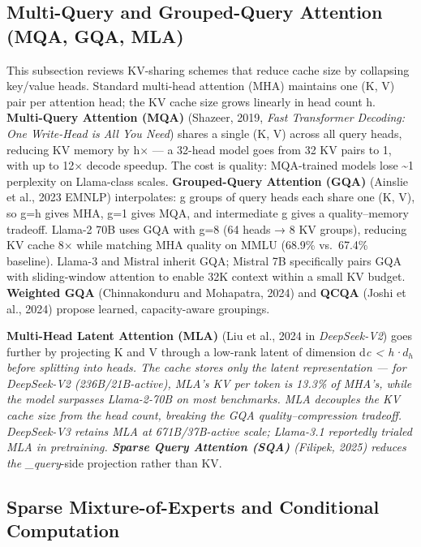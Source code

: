 \subsection{Multi-Query and Grouped-Query Attention (MQA, GQA, MLA)}\label{multi-query-and-grouped-query-attention-mqa-gqa-mla}

This subsection reviews KV-sharing schemes that reduce cache size by collapsing key/value heads. Standard multi-head attention (MHA) maintains one (K, V) pair per attention head; the KV cache size grows linearly in head count h. \textbf{Multi-Query Attention (MQA)} (Shazeer, 2019, \emph{Fast Transformer Decoding: One Write-Head is All You Need}) shares a single (K, V) across all query heads, reducing KV memory by h× --- a 32-head model goes from 32 KV pairs to 1, with up to 12× decode speedup. The cost is quality: MQA-trained models lose \textasciitilde1 perplexity on Llama-class scales. \textbf{Grouped-Query Attention (GQA)} (Ainslie et al., 2023 EMNLP) interpolates: g groups of query heads each share one (K, V), so g=h gives MHA, g=1 gives MQA, and intermediate g gives a quality--memory tradeoff. Llama-2 70B uses GQA with g=8 (64 heads → 8 KV groups), reducing KV cache 8× while matching MHA quality on MMLU (68.9\% vs.~67.4\% baseline). Llama-3 and Mistral inherit GQA; Mistral 7B specifically pairs GQA with sliding-window attention to enable 32K context within a small KV budget. \textbf{Weighted GQA} (Chinnakonduru and Mohapatra, 2024) and \textbf{QCQA} (Joshi et al., 2024) propose learned, capacity-aware groupings.

\textbf{Multi-Head Latent Attention (MLA)} (Liu et al., 2024 in \emph{DeepSeek-V2}) goes further by projecting K and V through a low-rank latent of dimension d\emph{c \textless{} h·\(d_h\) before splitting into heads. The cache stores only the latent representation --- for DeepSeek-V2 (236B/21B-active), MLA's KV per token is 13.3\% of MHA's, while the model surpasses Llama-2-70B on most benchmarks. MLA decouples the KV cache size from the head count, breaking the GQA quality--compression tradeoff. DeepSeek-V3 retains MLA at 671B/37B-active scale; Llama-3.1 reportedly trialed MLA in pretraining. \textbf{Sparse Query Attention (SQA)} (Filipek, 2025) reduces the \_query}-side projection rather than KV.

\subsection{Sparse Mixture-of-Experts and Conditional Computation}\label{sparse-mixture-of-experts-and-conditional-computation}

